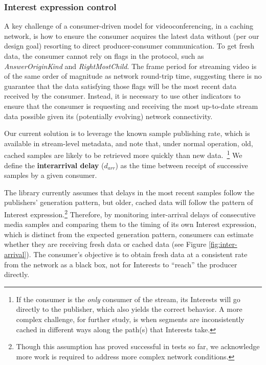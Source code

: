 \documentclass{icn/sig-alternate-2013} %
\begin{document}
\subsubsection{Interest expression control}


A key challenge of a consumer-driven model for videoconferencing, in a caching network, is how to ensure the consumer acquires the latest data without (per our design goal) resorting to direct producer-consumer communication.
To get fresh data, the consumer cannot rely on flags in the protocol, such as \textit{AnswerOriginKind} and \textit{RightMostChild}. The frame period for streaming video is of the same order of magnitude as network round-trip time, suggesting there is no guarantee that the data satisfying those flags will be the most recent data received by the consumer. Instead, it is necessary to use other indicators to ensure that the consumer is requesting and receiving the most up-to-date stream data possible given its (potentially evolving) network connectivity. 

Our current solution is to leverage the known sample publishing rate, which is available in stream-level metadata, and note that, under normal operation, old, cached samples are likely to be retrieved more quickly than new data.~\footnote{If the consumer is the \emph{only} consumer of the stream, its Interests will go directly to the publisher, which also yields the correct behavior. A more complex challenge, for further study, is when segments are inconsistently cached in different ways along the path(s) that Interests take.} We define the \textbf{interarrival delay} ($d_{arr}$) as the time between receipt of successive samples by a given consumer. 

The library currently assumes that delays in the most recent samples follow the publishers' generation pattern, but older, cached data will follow the pattern of Interest expression.\footnote{Though this assumption has proved successful in tests so far, we acknowledge more work is required to address more complex network conditions.} Therefore, by monitoring inter-arrival delays of consecutive media samples and comparing them to the timing of its own Interest expression, which is distinct from the expected generation pattern, consumers can estimate whether they are receiving fresh data or cached data (see Figure \ref{fig:inter-arrival}). The consumer's objective is to obtain fresh data at a consistent rate from the network as a black box, not for Interests to ``reach'' the producer directly.  
\end{document}
